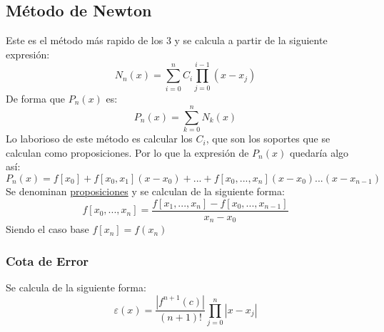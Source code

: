 \subsection{Método de Newton}
 Este es el método más rapido de los 3 y se calcula a partir de la siguiente expresión:
\[
        \boxed{N_n(x) = \sum^n_{i=0} C_i\prod^{i-1}_{j=0}(x-x_j)}
\]
 De forma que \(P_n(x)\) es:
\[
        \boxed{P_n(x) = \sum^n_{k=0} N_k(x)}
\]
 Lo laborioso de este método es calcular los \(C_i\), que son los soportes que se calculan como proposiciones. Por lo que la expresión de \(P_n(x)\) quedaría algo así:
\[
        \boxed{P_n(x) = f[x_0] + f[x_0,x_1](x-x_0) + ...+ f[x_0,..., x_n](x-x_0)...(x-x_{n-1})}
\]
 Se denominan \underline{proposiciones} y se calculan de la siguiente forma:
\[
        \boxed{f[x_0,...,x_n] = \frac{f[x_1,...,x_n] - f[x_0,...,x_{n-1}]}{x_n - x_0}}
\]
 Siendo el caso base \(f[x_n] = f(x_n)\)
\subsubsection{Cota de Error}
 Se calcula de la siguiente forma:
\[
        \boxed{
        \varepsilon(x) = \frac{\left | f^{n+1}(c) \right |}{(n+1)!}\prod^n_{j=0}\left | x-x_j \right |
        }
\]
